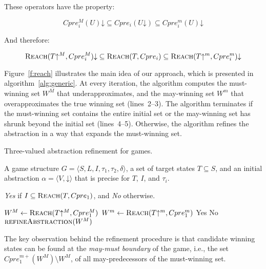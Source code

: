 \documentclass{book}
\newcommand{\reach}[0]{\textsc{Reach}}
\newcommand{\concrete}[1]{#1\mathord{\downarrow}}
\newcommand{\abstractm}[1]{#1\mathord{\uparrow^m}}
\newcommand{\abstractM}[1]{#1\mathord{\uparrow^M}}
\theoremstyle{definition}
\begin{document}
These operators have the property:

\begin{equation}
\concrete{Cpre_i^M(U)} \subseteq Cpre_i(\concrete{U}) \subseteq \concrete{Cpre_i^m(U)}
\end{equation}

And therefore:

\begin{equation}
\concrete{\reach(\abstractM{T}, Cpre_i^M)} \subseteq \reach(T, Cpre_i) \subseteq \concrete{\reach(\abstractm{T}, Cpre_i^m)}
\end{equation}

Figure~\ref{f:reach} illustrates the main idea of our approach, which is presented in algorithm~\ref{alg:generic}.  At every iteration, the algorithm computes the must-winning set $W^M$ that underapproximates, and the may-winning set $W^m$ that overapproximates the true winning set (lines~2--3).  The algorithm terminates if the must-winning set contains the entire initial set or the may-winning set has shrunk beyond the initial set (lines~4--5).  Otherwise, the algorithm refines the abstraction in a way that expands the must-winning set.

\begin{algorithm}
\caption{Three-valued abstraction refinement for games.}
\label{alg:generic}

\begin{algorithmic}[1]

     A game structure $G = \langle S, L, I, \tau_1, \tau_2, \delta \rangle$, a set 
    of target states $T\subseteq S$, and an initial abstraction $\alpha=\langle V, \concrete{} \rangle$
    that is precise for $T$, $I$, and $\tau_i$.

     {\it Yes} if $I \subseteq \reach(T, Cpre_1)$, and {\it No} otherwise.

    \Loop
        \State $W^M \gets \reach(\abstractM{T}, Cpre_1^M)$
        \State $W^m \gets \reach(\abstractm{T}, Cpre_1^m)$
        \If{$\abstractM{I} \subseteq W^M$} 
            \State\Return Yes
        \ElsIf{$\abstractM{I} \nsubseteq W^m$} 
            \State\Return No
        \Else       
            \State$\Call{refineAbstraction}{W^M}$
        \EndIf
    \EndLoop
\end{algorithmic}
\end{algorithm}

The key observation behind the refinement procedure is that candidate winning states can be found at the \emph{may-must boundary} of the game, i.e., the set $Cpre_1^{m+}(W^M)\setminus W^M$, of all may-predecessors of the must-winning set. 
\end{document}
